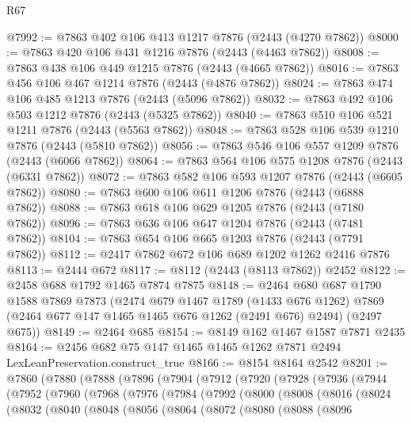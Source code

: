 \begin{lexlean}{R67}
\begin{coremodule}
@7992 := @7863 @402 @106 @413 @1217 @7876 (@2443 (@4270 @7862))
@8000 := @7863 @420 @106 @431 @1216 @7876 (@2443 (@4463 @7862))
@8008 := @7863 @438 @106 @449 @1215 @7876 (@2443 (@4665 @7862))
@8016 := @7863 @456 @106 @467 @1214 @7876 (@2443 (@4876 @7862))
@8024 := @7863 @474 @106 @485 @1213 @7876 (@2443 (@5096 @7862))
@8032 := @7863 @492 @106 @503 @1212 @7876 (@2443 (@5325 @7862))
@8040 := @7863 @510 @106 @521 @1211 @7876 (@2443 (@5563 @7862))
@8048 := @7863 @528 @106 @539 @1210 @7876 (@2443 (@5810 @7862))
@8056 := @7863 @546 @106 @557 @1209 @7876 (@2443 (@6066 @7862))
@8064 := @7863 @564 @106 @575 @1208 @7876 (@2443 (@6331 @7862))
@8072 := @7863 @582 @106 @593 @1207 @7876 (@2443 (@6605 @7862))
@8080 := @7863 @600 @106 @611 @1206 @7876 (@2443 (@6888 @7862))
@8088 := @7863 @618 @106 @629 @1205 @7876 (@2443 (@7180 @7862))
@8096 := @7863 @636 @106 @647 @1204 @7876 (@2443 (@7481 @7862))
@8104 := @7863 @654 @106 @665 @1203 @7876 (@2443 (@7791 @7862))
@8112 := @2417 @7862 @672 @106 @689 @1202 @1262 @2416 @7876
@8113 := @2444 @672
@8117 := @8112 (@2443 (@8113 @7862)) @2452
@8122 := @2458 @688 @1792 @1465 @7874 @7875
@8148 := @2464
    @680
    @687
    @1790
    @1588
    @7869
    @7873
    (@2474
      @679
      @1467
      @1789
      (@1433 @676 @1262)
      @7869
      (@2464 @677 @147 @1465 @1465 @676 @1262 (@2491 @676) @2494)
      (@2497 @675))
@8149 := @2464 @685
@8154 := @8149 @162 @1467 @1587 @7871 @2435
@8164 := @2456 @682 @75 @147 @1465 @1465 @1262 @7871 @2494 LexLeanPreservation.construct_true
@8166 := @8154 @8164 @2542
@8201 := @7860
    (@7880
      (@7888
        (@7896
          (@7904
            (@7912
              (@7920
                (@7928
                  (@7936
                    (@7944
                      (@7952
                        (@7960
                          (@7968
                            (@7976
                              (@7984
                                (@7992
                                  (@8000
                                    (@8008
                                      (@8016
                                        (@8024
                                          (@8032
                                            (@8040
                                              (@8048
                                                (@8056
                                                  (@8064
                                                    (@8072
                                                      (@8080
                                                        (@8088
                                                          (@8096

\end{coremodule}
\end{lexlean}
